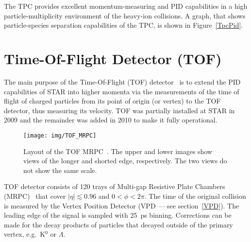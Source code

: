 The TPC provides excellent momentum-measuring and PID capabilities in a high particle-multiplicity environment of the heavy-ion collisions.
A graph, that shows particle-species separation capabilities of the TPC, is shown in Figure~\ref{TpcPid}.
\section{Time-Of-Flight Detector (TOF)\label{TOFsection}} 



The main purpose of the Time-Of-Flight (TOF) detector~\cite{TOFproposal} is to extend the PID capabilities of STAR into higher 
momenta via the measurements of the time of flight of charged particles from its point of origin  (or vertex) to the TOF 
detector, thus measuring its velocity. TOF was partially installed at STAR in 2009 and the remainder was added in 2010 
to make it fully operational.

\begin{figure}[!htb]
\begin{center}
 \texttt{[image: img/TOF\_MRPC]}\\
\end{center}
\caption[Layout of the TOF MRPC\@.]{\label{TOF_mrpc}Layout of the TOF MRPC~\cite{TOFproposal}\@. The upper and lower images show views of the longer and shorted edge, respectively. The two views do not show the same scale.}
\end{figure}

TOF detector consists of 120 trays of Multi-gap Resistive Plate Chambers (MRPC)~\cite{MRPC} that cover $|\eta| \lesssim 0.96$ and $0 < \phi < 2\pi$. The time of the original collision is measured 
by the Vertex Position Detector (VPD --- see section~\ref{VPD}). The leading edge of 
the signal is sampled with \SI{25}{\pico\second} binning. Corrections can be made for the decay products of particles that 
decayed outside of the primary vertex, e.g.\ K$^0$ or $\Lambda$\@. 



